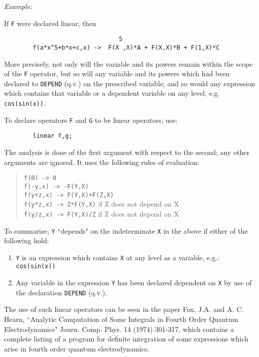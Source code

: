 {\it Example:}

If {\tt F} were declared linear, then
\begin{verbatim}
                                5
        f(a*x^5+b*x+c,x) ->  F(X ,X)*A + F(X,X)*B + F(1,X)*C
\end{verbatim}
More precisely, not only will the variable and its powers remain within the
scope of the {\tt F} operator, but so will any variable and its powers which had
been declared to {\tt DEPEND} (q.v.) on the prescribed variable; and so would
any expression which contains that variable or a dependent variable on any
level, e.g. {\tt cos(sin(x))}.

To declare operators {\tt F} and {\tt G} to be linear operators,
use:
\begin{verbatim}
        linear f,g;
\end{verbatim}
The analysis is done of the first argument with respect to the second; any
other arguments are ignored. It uses the following rules of evaluation:
\begin{quote}
\begin{tabbing}
{\tt    f(0)      ->   0} \\
{\tt    f(-y,x)   ->  -F(Y,X)} \\
{\tt    f(y+z,x)  ->   F(Y,X)+F(Z,X)} \\
{\tt    f(y*z,x)  ->   Z*F(Y,X)} \hspace{0.5in}\= if Z does not depend on X \\
{\tt    f(y/z,x)  ->   F(Y,X)/Z} \> if Z does not depend on X
\end{tabbing}
\end{quote}
To summarize, {\tt Y} ``depends" on the indeterminate {\tt X} in the above
if either of the following hold:
\begin{enumerate}
\item {\tt Y} is an expression which contains {\tt X} at any level as a
      variable, e.g.: {\tt cos(sin(x))}

\item Any variable in the expression {\tt Y} has been declared dependent on
      {\tt X} by use of the declaration {\tt DEPEND} (q.v.).
\end{enumerate}
The use of such linear operators can be seen in the
paper Fox, J.A. and A. C. Hearn, ``Analytic Computation of Some Integrals
in Fourth Order Quantum Electrodynamics" Journ. Comp. Phys. 14 (1974)
301-317, which contains a complete listing of a program for definite
integration of some expressions which arise in fourth
order quantum electrodynamics.

